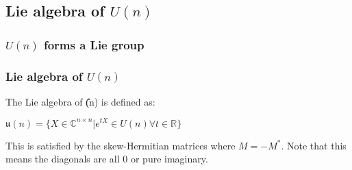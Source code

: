 

\subsection{Lie algebra of \(U(n)\)}

\subsubsection{\(U(n)\) forms a Lie group}

\subsubsection{Lie algebra of \(U(n)\)}

The Lie algebra of \U(n)\) is defined as:

\(\mathfrak{u}(n)=\{X\in \mathbb {C}^{n\times n}|e^{tX}\in U(n) \forall t\in \mathbb{R}\}\)

This is satisfied by the skew-Hermitian matrices where \(M=-M^*\). Note that this means the diagonals are all \(0\) or pure imaginary.

